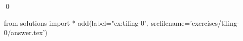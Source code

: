 \begin{ex}
  \label{ex:tiling-0}
  
  \qed
\end{ex}
\begin{python0}
from solutions import *
add(label="ex:tiling-0",
    srcfilename='exercises/tiling-0/answer.tex') 
\end{python0}                              
